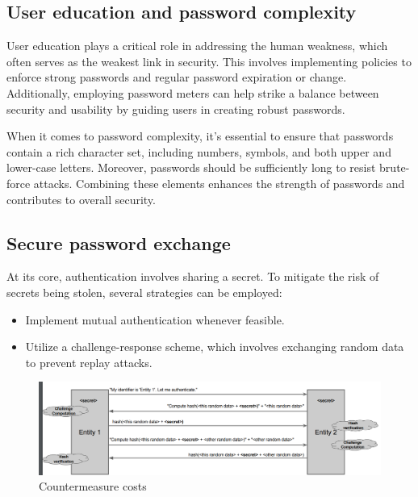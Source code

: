 \subsection{User education and password complexity}
User education plays a critical role in addressing the human weakness, which often serves as the weakest link in security. 
This involves implementing policies to enforce strong passwords and regular password expiration or change. 
Additionally, employing password meters can help strike a balance between security and usability by guiding users in creating robust passwords.

When it comes to password complexity, it's essential to ensure that passwords contain a rich character set, including numbers, symbols, and both upper and lower-case letters. 
Moreover, passwords should be sufficiently long to resist brute-force attacks. 
Combining these elements enhances the strength of passwords and contributes to overall security.

\subsection{Secure password exchange}
At its core, authentication involves sharing a secret. To mitigate the risk of secrets being stolen, several strategies can be employed:
\begin{itemize}
    \item Implement mutual authentication whenever feasible.
    \item Utilize a challenge-response scheme, which involves exchanging random data to prevent replay attacks.
\end{itemize}
\begin{figure}[H]
    \centering
    \includegraphics[width=0.75\linewidth]{images/auth2.png}
    \caption{Countermeasure costs}
\end{figure}

